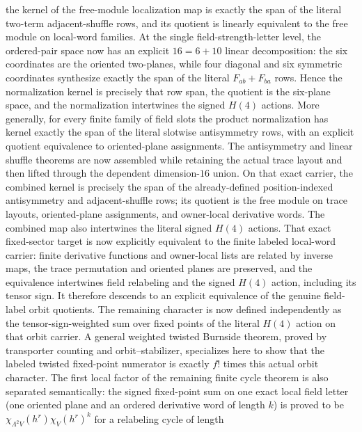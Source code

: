 \documentclass[11pt]{article}
\theoremstyle{definition}
\begin{document}
\begin{itemize}
    the kernel of the free-module localization map is exactly the span of the
    literal two-term adjacent-shuffle rows, and its quotient is linearly
    equivalent to the free module on local-word families.  At the single
    field-strength-letter level, the
    ordered-pair space now has an explicit $16=6+10$ linear decomposition:
    the six coordinates are the oriented two-planes, while four diagonal and
    six symmetric coordinates synthesize exactly the span of the literal
    $F_{ab}+F_{ba}$ rows.  Hence the normalization kernel is precisely that
    row span, the quotient is the six-plane space, and the normalization
    intertwines the signed $H(4)$ actions.  More generally, for every finite
    family of field slots the product normalization has kernel exactly the
    span of the literal slotwise antisymmetry rows, with an explicit quotient
    equivalence to oriented-plane assignments.  The antisymmetry and linear
    shuffle theorems are now assembled while retaining the actual trace
    layout and then lifted through the dependent dimension-$16$ union.  On
    that exact carrier, the combined kernel is precisely the span of the
    already-defined position-indexed antisymmetry and adjacent-shuffle rows;
    its quotient is the free module on trace layouts, oriented-plane
    assignments, and owner-local derivative words.  The combined map also
    intertwines the literal signed $H(4)$ actions.  That exact fixed-sector
    target is now explicitly equivalent to the finite labeled local-word
    carrier: finite derivative functions and owner-local lists are related by
    inverse maps, the trace permutation and oriented planes are preserved,
    and the equivalence intertwines field relabeling and the signed $H(4)$
    action, including its tensor sign.  It therefore descends to an explicit
    equivalence of the genuine field-label orbit quotients.  The remaining
    character is now defined independently as the tensor-sign-weighted sum
    over fixed points of the literal $H(4)$ action on that orbit carrier.  A
    general weighted twisted Burnside theorem, proved by transporter counting
    and orbit--stabilizer, specializes here to show that the labeled twisted
    fixed-point numerator is exactly $f!$ times this actual orbit character.
    The first local factor of the remaining finite cycle theorem is also
    separated semantically: the signed fixed-point sum on one exact local
    field letter (one oriented plane and an ordered derivative word of length
    $k$) is proved to be
    $\chi_{\Lambda^2V}(h^r)\chi_V(h^r)^k$ for a relabeling cycle of length

\end{itemize}
\end{document}
